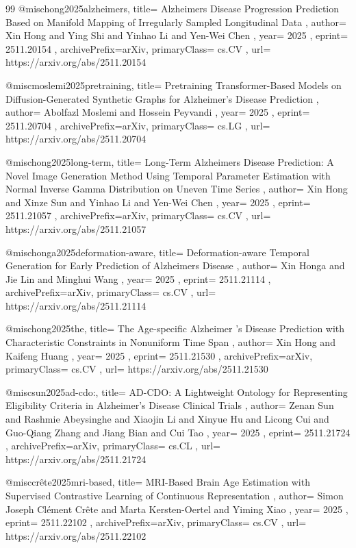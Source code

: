 \documentclass[11pt,a4paper]{article}
\begin{document}
\begin{thebibliography}{99}
@misc{hong2025alzheimers,
  title={ Alzheimers Disease Progression Prediction Based on Manifold Mapping of Irregularly Sampled Longitudinal Data },
  author={ Xin Hong and Ying Shi and Yinhao Li and Yen-Wei Chen },
  year={ 2025 },
  eprint={ 2511.20154 },
  archivePrefix={arXiv},
  primaryClass={ cs.CV },
  url={ https://arxiv.org/abs/2511.20154 }
}


@misc{moslemi2025pretraining,
  title={ Pretraining Transformer-Based Models on Diffusion-Generated Synthetic Graphs for Alzheimer's Disease Prediction },
  author={ Abolfazl Moslemi and Hossein Peyvandi },
  year={ 2025 },
  eprint={ 2511.20704 },
  archivePrefix={arXiv},
  primaryClass={ cs.LG },
  url={ https://arxiv.org/abs/2511.20704 }
}


@misc{hong2025long-term,
  title={ Long-Term Alzheimers Disease Prediction: A Novel Image Generation Method Using Temporal Parameter Estimation with Normal Inverse Gamma Distribution on Uneven Time Series },
  author={ Xin Hong and Xinze Sun and Yinhao Li and Yen-Wei Chen },
  year={ 2025 },
  eprint={ 2511.21057 },
  archivePrefix={arXiv},
  primaryClass={ cs.CV },
  url={ https://arxiv.org/abs/2511.21057 }
}


@misc{honga2025deformation-aware,
  title={ Deformation-aware Temporal Generation for Early Prediction of Alzheimers Disease },
  author={ Xin Honga and Jie Lin and Minghui Wang },
  year={ 2025 },
  eprint={ 2511.21114 },
  archivePrefix={arXiv},
  primaryClass={ cs.CV },
  url={ https://arxiv.org/abs/2511.21114 }
}


@misc{hong2025the,
  title={ The Age-specific Alzheimer 's Disease Prediction with Characteristic Constraints in Nonuniform Time Span },
  author={ Xin Hong and Kaifeng Huang },
  year={ 2025 },
  eprint={ 2511.21530 },
  archivePrefix={arXiv},
  primaryClass={ cs.CV },
  url={ https://arxiv.org/abs/2511.21530 }
}


@misc{sun2025ad-cdo:,
  title={ AD-CDO: A Lightweight Ontology for Representing Eligibility Criteria in Alzheimer's Disease Clinical Trials },
  author={ Zenan Sun and Rashmie Abeysinghe and Xiaojin Li and Xinyue Hu and Licong Cui and Guo-Qiang Zhang and Jiang Bian and Cui Tao },
  year={ 2025 },
  eprint={ 2511.21724 },
  archivePrefix={arXiv},
  primaryClass={ cs.CL },
  url={ https://arxiv.org/abs/2511.21724 }
}


@misc{crête2025mri-based,
  title={ MRI-Based Brain Age Estimation with Supervised Contrastive Learning of Continuous Representation },
  author={ Simon Joseph Clément Crête and Marta Kersten-Oertel and Yiming Xiao },
  year={ 2025 },
  eprint={ 2511.22102 },
  archivePrefix={arXiv},
  primaryClass={ cs.CV },
  url={ https://arxiv.org/abs/2511.22102 }
}



\end{thebibliography}
\end{document}
